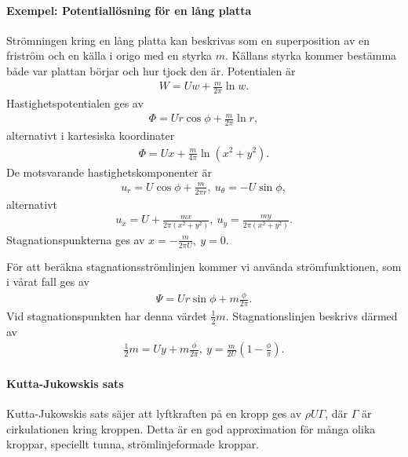 \paragraph{Exempel: Potentiallösning för en lång platta}
Strömningen kring en lång platta kan beskrivas som en superposition av en friström och en källa i origo med en styrka $m$. Källans styrka kommer bestämma både var plattan börjar och hur tjock den är. Potentialen är
\begin{align*}
	W = Uw + \frac{m}{2\pi}\ln{w}.
\end{align*}
Hastighetspotentialen ges av
\begin{align*}
	\Phi = Ur\cos{\phi} + \frac{m}{2\pi}\ln{r},
\end{align*}
alternativt i kartesiska koordinater
\begin{align*}
	\Phi = Ux + \frac{m}{4\pi}\ln(x^{2} + y^{2}).
\end{align*}
De motsvarande hastighetskomponenter är
\begin{align*}
	u_{r} = U\cos{\phi} + \frac{m}{2\pi r},\ u_{\theta} = -U\sin{\phi},
\end{align*}
alternativt
\begin{align*}
	u_{x} = U + \frac{mx}{2\pi(x^{2} + y^{2})},\ u_{y} = \frac{my}{2\pi(x^{2} + y^{2})}.
\end{align*}
Stagnationspunkterna ges av $x = -\frac{m}{2\pi U},\ y = 0$.

För att beräkna stagnationsströmlinjen kommer vi använda strömfunktionen, som i vårat fall ges av
\begin{align*}
	\Psi = Ur\sin{\phi} + m\frac{\phi}{2\pi}.
\end{align*}
Vid stagnationspunkten har denna värdet $\frac{1}{2}m$. Stagnationslinjen beskrivs därmed av
\begin{align*}
	\frac{1}{2}m = Uy + m\frac{\phi}{2\pi},\ y = \frac{m}{2U}\left(1 - \frac{\phi}{\pi}\right).
\end{align*}

\paragraph{Kutta-Jukowskis sats}
Kutta-Jukowskis sats säjer att lyftkraften på en kropp ges av $\rho U\Gamma$, där $\Gamma$ är cirkulationen kring kroppen. Detta är en god approximation för många olika kroppar, speciellt tunna, strömlinjeformade kroppar.